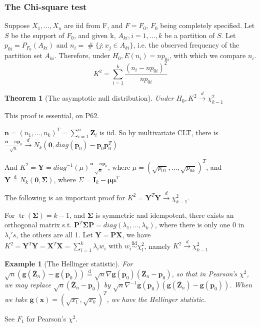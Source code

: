 \documentclass{ctexart}
\newtheorem{theorem}{Theorem}[subsection]
\newtheorem{example}{Example}[subsection]
\begin{document}
\subsubsection{The Chi-square test}
Suppose \(X_{1},\ldots,X_{n}\) are iid from F, and \(F=F_{0}\), \(F_{0}\) being completely specified. Let \(S\) be the support of \(F_{0}\), and given k, \(A_{ki},i=1,\ldots,k\) be a partition of \(S\). 
Let \(p_{0i}=P_{F_{0}}(A_{ki})\) and \(n_{i}=\operatorname{\#}\{j:x_{j}\in A_{ki}\}\), i.e. the observed frequency of the partition set \(A_{ki}\).
Therefore, under \(H_{0}, E(n_{i})=np_{0i}\), with which we compare \(n_{i}\). 
\[
K^{2}=\sum_{i=1}^{k} \frac{(n_{i}-np_{0i})^{2}}{np_{0i}}
\]             
\begin{theorem}[The asymptotic null distribution]
  Under \(H_{0},K^{2}\xrightarrow{d}\chi^{2}_{k-1}\) 
\end{theorem}
This proof is essential, on P62. 

\(\boldsymbol{n}=(n_{1},\ldots,n_{k})^{T}=\sum_{i=1}^{n} \boldsymbol{Z}_{i}\) is iid. So by multivariate CLT, there is \(\frac{\boldsymbol{n}-n \boldsymbol{p}_{0}}{\sqrt{n}}\xrightarrow{d}N_{k}(\boldsymbol{0},diag(\boldsymbol{p}_{0})-\boldsymbol{p}_{0}\boldsymbol{p}_{0}^{T})\)  

And \(K^{2}=\boldsymbol{Y}=diag ^{-1}(\mu)\frac{\boldsymbol{n}-n \boldsymbol{p}_{0}}{\sqrt{n}}\), where \(\mu=(\sqrt{p_{01}},\ldots, \sqrt{p_{0k}})^{T}\), and \(\boldsymbol{Y}\overset{\text{d}}{=}N_{k}(\boldsymbol{0},\boldsymbol{\Sigma})\), where \(\Sigma=\boldsymbol{I}_{k}-\boldsymbol{\mu}\boldsymbol{\mu}^{T}\)    

The following is an important proof for \(K^{2}=\boldsymbol{Y}^{T} \boldsymbol{Y}\xrightarrow{d}\chi^{2}_{k-1}\). 

For \(\operatorname{tr}(\boldsymbol{\Sigma})=k-1\), and \(\boldsymbol{\Sigma}\) is symmetric and idempotent, there exists an orthogonal matrix  s.t. \(\boldsymbol{P}^{T}\boldsymbol{\Sigma}\boldsymbol{P}=diag(\lambda_{1},\ldots,\lambda_{k})\), where there is only one 0 in \(\lambda_{i}'s\), the others are all 1.
Let \(\boldsymbol{Y}=\boldsymbol{P}\boldsymbol{X}\), we have \(K^{2}=\boldsymbol{Y}^{T}\boldsymbol{Y}=\boldsymbol{X}^{T}\boldsymbol{X}=\sum_{i=1}^{k} \lambda_{i}w_{i}\text{ with } w_{i}\overset{\text{iid}}{\sim}\chi_{1}^{2}\), namely \(K^{2}\xrightarrow{d}\chi_{k-1}^{2}\)   

\begin{example}[The Hellinger statistic]
For \(\sqrt{n}(\boldsymbol{g}(\overline{\boldsymbol{Z}}_{n})-\boldsymbol{g}(\boldsymbol{p}_{0}))\overset{\text{d}}{=}\sqrt{n}\nabla \boldsymbol{g}(\boldsymbol{p}_{0})(\overline{\boldsymbol{Z}}_{n}-\boldsymbol{p}_{0})\), so that in Pearson's \(\chi^{2}\), we may replace 
\(\sqrt{n}(\overline{\boldsymbol{Z}}_{n}-\boldsymbol{p}_{0})\) by \(\sqrt{n}\nabla ^{-1}\boldsymbol{g}(\boldsymbol{p}_{0})(\boldsymbol{g}(\overline{\boldsymbol{Z}}_{n})-\boldsymbol{g}(\boldsymbol{p}_{0}))\). When we take \(\boldsymbol{g}(\boldsymbol{x})=(\sqrt{x_{1}}, \sqrt{x_{k}})^{T}\), we have the Hellinger statistic.         
\end{example}
See \(F_{1}\) for Pearson's \(\chi^{2}\).
\end{document}
